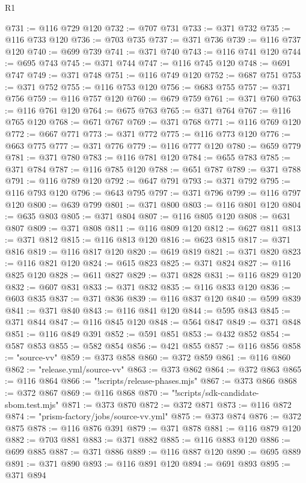\begin{lexlean}{R1}
\begin{coremodule}
@731 := @116 @729 @120
@732 := @707 @731
@733 := @371 @732
@735 := @116 @733 @120
@736 := @703 @735
@737 := @371 @736
@739 := @116 @737 @120
@740 := @699 @739
@741 := @371 @740
@743 := @116 @741 @120
@744 := @695 @743
@745 := @371 @744
@747 := @116 @745 @120
@748 := @691 @747
@749 := @371 @748
@751 := @116 @749 @120
@752 := @687 @751
@753 := @371 @752
@755 := @116 @753 @120
@756 := @683 @755
@757 := @371 @756
@759 := @116 @757 @120
@760 := @679 @759
@761 := @371 @760
@763 := @116 @761 @120
@764 := @675 @763
@765 := @371 @764
@767 := @116 @765 @120
@768 := @671 @767
@769 := @371 @768
@771 := @116 @769 @120
@772 := @667 @771
@773 := @371 @772
@775 := @116 @773 @120
@776 := @663 @775
@777 := @371 @776
@779 := @116 @777 @120
@780 := @659 @779
@781 := @371 @780
@783 := @116 @781 @120
@784 := @655 @783
@785 := @371 @784
@787 := @116 @785 @120
@788 := @651 @787
@789 := @371 @788
@791 := @116 @789 @120
@792 := @647 @791
@793 := @371 @792
@795 := @116 @793 @120
@796 := @643 @795
@797 := @371 @796
@799 := @116 @797 @120
@800 := @639 @799
@801 := @371 @800
@803 := @116 @801 @120
@804 := @635 @803
@805 := @371 @804
@807 := @116 @805 @120
@808 := @631 @807
@809 := @371 @808
@811 := @116 @809 @120
@812 := @627 @811
@813 := @371 @812
@815 := @116 @813 @120
@816 := @623 @815
@817 := @371 @816
@819 := @116 @817 @120
@820 := @619 @819
@821 := @371 @820
@823 := @116 @821 @120
@824 := @615 @823
@825 := @371 @824
@827 := @116 @825 @120
@828 := @611 @827
@829 := @371 @828
@831 := @116 @829 @120
@832 := @607 @831
@833 := @371 @832
@835 := @116 @833 @120
@836 := @603 @835
@837 := @371 @836
@839 := @116 @837 @120
@840 := @599 @839
@841 := @371 @840
@843 := @116 @841 @120
@844 := @595 @843
@845 := @371 @844
@847 := @116 @845 @120
@848 := @564 @847
@849 := @371 @848
@851 := @116 @849 @391
@852 := @591 @851
@853 := @432 @852
@854 := @587 @853
@855 := @582 @854
@856 := @421 @855
@857 := @116 @856
@858 := "source-vv"
@859 := @373 @858
@860 := @372 @859
@861 := @116 @860
@862 := "release.yml/source-vv"
@863 := @373 @862
@864 := @372 @863
@865 := @116 @864
@866 := "!scripts/release-phases.mjs"
@867 := @373 @866
@868 := @372 @867
@869 := @116 @868
@870 := "!scripts/sdk-candidate-sbom.test.mjs"
@871 := @373 @870
@872 := @372 @871
@873 := @116 @872
@874 := "prism-factory/jobs/source-vv.yml"
@875 := @373 @874
@876 := @372 @875
@878 := @116 @876 @391
@879 := @371 @878
@881 := @116 @879 @120
@882 := @703 @881
@883 := @371 @882
@885 := @116 @883 @120
@886 := @699 @885
@887 := @371 @886
@889 := @116 @887 @120
@890 := @695 @889
@891 := @371 @890
@893 := @116 @891 @120
@894 := @691 @893
@895 := @371 @894

\end{coremodule}
\end{lexlean}
